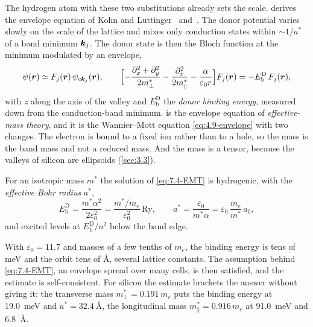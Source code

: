 The hydrogen atom with these two substitutions already sets the scale.  derives the envelope equation of Kohn and Luttinger~\cite{kohn1955theory} and~\cite[Chap.~4]{yu2010fundamentals}. The donor potential varies slowly on the scale of the lattice and mixes only conduction states within $\sim 1/a^*$ of a band minimum $\bm{k}_j$. The donor state is then the Bloch function at the minimum modulated by an envelope,
\begin{equation}
  \psi(\bm{r}) \simeq F_j(\bm{r})\,\psi_{c\bm{k}_j}(\bm{r}) , \qquad
  \Bigl[-\frac{\partial_x^2 + \partial_y^2}{2m^*_\perp} - \frac{\partial_z^2}{2m^*_\parallel} - \frac{\alpha}{\varepsilon_0 r}\Bigr]F_j(\bm{r}) = -E_{\mathrm{b}}^{\mathrm{D}}\,F_j(\bm{r}) ,
  \label{eq:7.4-EMT}
\end{equation}
with $z$ along the axis of the valley and $E_{\mathrm{b}}^{\mathrm{D}}$ the \emph{donor binding energy}, measured down from the conduction-band minimum.  is the envelope equation of \emph{effective-mass theory}, and it is the Wannier--Mott equation \cref{eq:4.9-envelope} with two changes. The electron is bound to a fixed ion rather than to a hole, so the mass is the band mass and not a reduced mass. And the mass is a tensor, because the valleys of silicon are ellipsoids (\cref{sec:3.3}).

\begin{keyresult}
For an isotropic mass $m^*$ the solution of \cref{eq:7.4-EMT} is hydrogenic, with the \emph{effective Bohr radius} $a^*$,
\begin{equation}
  E_{\mathrm{b}}^{\mathrm{D}} = \frac{m^*\alpha^2}{2\varepsilon_0^2} = \frac{m^*/m_e}{\varepsilon_0^2}\,\mathrm{Ry} , \qquad
  a^* = \frac{\varepsilon_0}{m^*\alpha} = \varepsilon_0\,\frac{m_e}{m^*}\,a_0 ,
  \label{eq:7.4-hydrogenic}
\end{equation}
and excited levels at $E_{\mathrm{b}}^{\mathrm{D}}/n^2$ below the band edge.
\end{keyresult}
With $\varepsilon_0 = 11.7$ and masses of a few tenths of $m_e$, the binding energy is tens of meV and the orbit tens of \si{\angstrom}, several lattice constants. The assumption behind \cref{eq:7.4-EMT}, an envelope spread over many cells, is then satisfied, and the estimate is self-consistent. For silicon the estimate brackets the answer without giving it: the transverse mass $m^*_\perp = 0.191\,m_e$ puts the binding energy at \SI{19.0}{meV} and $a^* = \SI{32.4}{\angstrom}$, the longitudinal mass $m^*_\parallel = 0.916\,m_e$ at \SI{91.0}{meV} and \SI{6.8}{\angstrom}.

